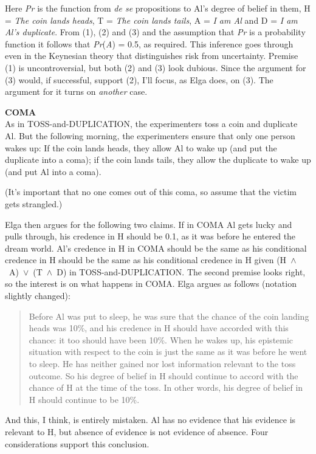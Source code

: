 \documentclass[
  11pt,
  letterpaper,
  DIV=11,
  numbers=noendperiod,
  oneside]{scrartcl}
\begin{document}
Here \emph{Pr} is the function from \emph{de se} propositions to Al's
degree of belief in them, H = \emph{The coin lands heads}, T = \emph{The
coin lands tails}, A = \emph{I am Al} and D = \emph{I am Al's
duplicate}. From (1), (2) and (3) and the assumption that \emph{Pr} is a
probability function it follows that \emph{Pr}(\emph{A}) = 0.5, as
required. This inference goes through even in the Keynesian theory that
distinguishes risk from uncertainty. Premise (1) is uncontroversial, but
both (2) and (3) look dubious. Since the argument for (3) would, if
successful, support (2), I'll focus, as Elga does, on (3). The argument
for it turns on \emph{another} case.

\textbf{COMA}\\
As in TOSS-and-DUPLICATION, the experimenters toss a coin and duplicate
Al. But the following morning, the experimenters ensure that only one
person wakes up: If the coin lands heads, they allow Al to wake up (and
put the duplicate into a coma); if the coin lands tails, they allow the
duplicate to wake up (and put Al into a coma).

(It's important that no one comes out of this coma, so assume that the
victim gets strangled.)

Elga then argues for the following two claims. If in COMA Al gets lucky
and pulls through, his credence in H should be 0.1, as it was before he
entered the dream world. Al's credence in H in COMA should be the same
as his conditional credence in H should be the same as his conditional
credence in H given (H~\({\wedge}\)~A)~\({\vee}\)~(T~\({\wedge}\)~D) in
TOSS-and-DUPLICATION. The second premise looks right, so the interest is
on what happens in COMA. Elga argues as follows (notation slightly
changed):

\begin{quote}
Before Al was put to sleep, he was sure that the chance of the coin
landing heads was 10\%, and his credence in H should have accorded with
this chance: it too should have been 10\%. When he wakes up, his
epistemic situation with respect to the coin is just the same as it was
before he went to sleep. He has neither gained nor lost information
relevant to the toss outcome. So his degree of belief in H should
continue to accord with the chance of H at the time of the toss. In
other words, his degree of belief in H should continue to be 10\%.
\end{quote}

And this, I think, is entirely mistaken. Al has no evidence that his
evidence is relevant to H, but absence of evidence is not evidence of
absence. Four considerations support this conclusion.
\end{document}
